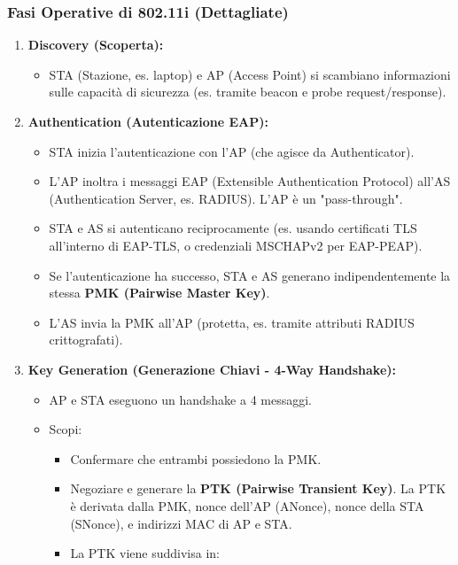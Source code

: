 \subsubsection{Fasi Operative di 802.11i (Dettagliate)}
\label{ssubsec:80211i_phases_detailed}
\begin{enumerate}
    \item \textbf{Discovery (Scoperta):}
        \begin{itemize}
            \item STA (Stazione, es. laptop) e AP (Access Point) si scambiano informazioni sulle capacità di sicurezza (es. tramite beacon e probe request/response).
        \end{itemize}
    \item \textbf{Authentication (Autenticazione EAP):}
        \begin{itemize}
            \item STA inizia l'autenticazione con l'AP (che agisce da Authenticator).
            \item L'AP inoltra i messaggi EAP (Extensible Authentication Protocol) all'AS (Authentication Server, es. RADIUS). L'AP è un "pass-through".
            \item STA e AS si autenticano reciprocamente (es. usando certificati TLS all'interno di EAP-TLS, o credenziali MSCHAPv2 per EAP-PEAP).
            \item Se l'autenticazione ha successo, STA e AS generano indipendentemente la stessa \textbf{PMK (Pairwise Master Key)}.
            \item L'AS invia la PMK all'AP (protetta, es. tramite attributi RADIUS crittografati).
        \end{itemize}
    \item \textbf{Key Generation (Generazione Chiavi - 4-Way Handshake):}
        \begin{itemize}
            \item AP e STA eseguono un handshake a 4 messaggi.
            \item Scopi:
                \begin{itemize}
                    \item Confermare che entrambi possiedono la PMK.
                    \item Negoziare e generare la \textbf{PTK (Pairwise Transient Key)}. La PTK è derivata dalla PMK, nonce dell'AP (ANonce), nonce della STA (SNonce), e indirizzi MAC di AP e STA.
                    \item La PTK viene suddivisa in:

\end{itemize}
\end{itemize}
\end{enumerate}

